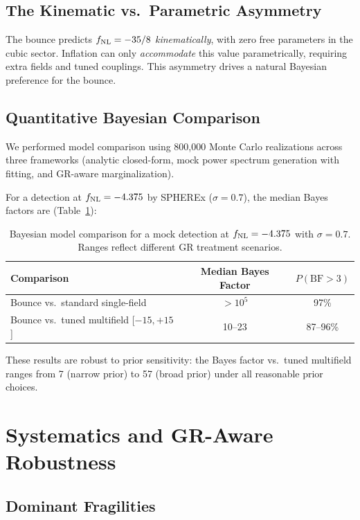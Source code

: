 \documentclass[a4paper,11pt]{article}
\newcommand{\fnl}{f_{\rm NL}}
\begin{document}
\subsection{The Kinematic vs.\ Parametric Asymmetry}

The bounce predicts $\fnl = -35/8$ \emph{kinematically}, with zero free parameters in the cubic sector. Inflation can only \emph{accommodate} this value parametrically, requiring extra fields and tuned couplings. This asymmetry drives a natural Bayesian preference for the bounce.

\subsection{Quantitative Bayesian Comparison}

We performed model comparison using 800{,}000 Monte Carlo realizations across three frameworks (analytic closed-form, mock power spectrum generation with fitting, and GR-aware marginalization).

For a detection at $\fnl = -4.375$ by SPHEREx ($\sigma = 0.7$), the median Bayes factors are (Table~\ref{tab:bayes}):

\begin{table}[h]
\centering
\begin{tabular}{lcc}
\toprule
Comparison & Median Bayes Factor & $P(\text{BF} > 3)$ \\
\midrule
Bounce vs.\ standard single-field & $> 10^5$ & 97\% \\
Bounce vs.\ tuned multifield [$-15,+15$] & 10--23 & 87--96\% \\
\bottomrule
\end{tabular}
\caption{Bayesian model comparison for a mock detection at $\fnl = -4.375$ with $\sigma = 0.7$. Ranges reflect different GR treatment scenarios.}
\label{tab:bayes}
\end{table}

These results are robust to prior sensitivity: the Bayes factor vs.\ tuned multifield ranges from 7 (narrow prior) to 57 (broad prior) under all reasonable prior choices.

\section{Systematics and GR-Aware Robustness}
\label{sec:systematics}

\subsection{Dominant Fragilities}
\end{document}
